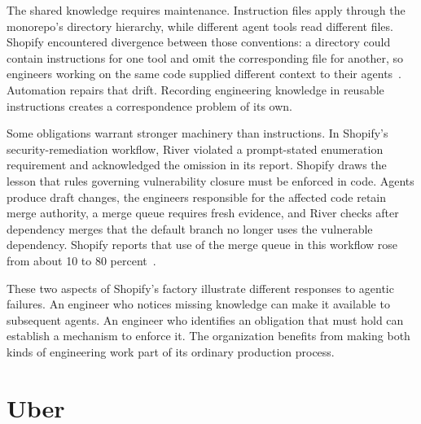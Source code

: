 
The shared knowledge requires maintenance. Instruction files apply through the monorepo's directory hierarchy, while different agent tools read different files. Shopify encountered divergence between those conventions: a directory could contain instructions for one tool and omit the corresponding file for another, so engineers working on the same code supplied different context to their agents~\citep{lutke2026splitbrain,caswell2026agentsmd}. Automation repairs that drift. Recording engineering knowledge in reusable instructions creates a correspondence problem of its own.


Some obligations warrant stronger machinery than instructions. In Shopify's security-remediation workflow, River violated a prompt-stated enumeration requirement and acknowledged the omission in its report. Shopify draws the lesson that rules governing vulnerability closure must be enforced in code. Agents produce draft changes, the engineers responsible for the affected code retain merge authority, a merge queue requires fresh evidence, and River checks after dependency merges that the default branch no longer uses the vulnerable dependency. Shopify reports that use of the merge queue in this workflow rose from about 10 to 80 percent~\citep{son2026security}.

These two aspects of Shopify's factory illustrate different responses to agentic failures. An engineer who notices missing knowledge can make it available to subsequent agents. An engineer who identifies an obligation that must hold can establish a mechanism to enforce it. The organization benefits from making both kinds of engineering work part of its ordinary production process.

\section{Uber}\label{heading:uber}


